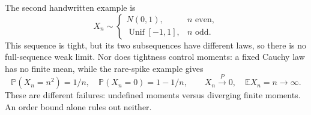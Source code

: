 \documentclass[12pt]{article}
\newcommand{\E}{\mathbb E}
\newcommand{\Prob}{\mathbb P}
\begin{document}
The second handwritten example is
\begin{equation}
 X_n\sim
 \begin{cases}N(0,1),&n\text{ even},\\
 \operatorname{Unif}[-1,1],&n\text{ odd}.
 \end{cases}
\end{equation}
This sequence is tight, but its two subsequences have different laws, so
there is no full-sequence weak limit. Nor does tightness control moments:
a fixed Cauchy law has no finite mean, while the rare-spike example gives
\begin{equation}
 \Prob(X_n=n^2)=1/n,\quad \Prob(X_n=0)=1-1/n,
 \qquad X_n\xrightarrow{P}0,\quad \E X_n=n\to\infty.
\end{equation}
These are different failures: undefined moments versus diverging finite
moments. An order bound alone rules out neither.
\end{document}
